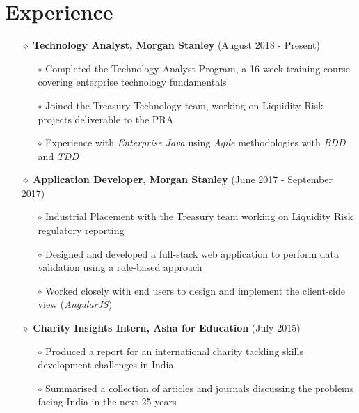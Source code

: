 \documentclass[a4paper]{article}
\begin{document}
\vspace{-10pt}
\section*{Experience}
\vspace{-7pt}

\begin{itemize} 
\item[$\diamond$] \textbf{Technology Analyst, Morgan Stanley} (August 2018 - Present)
\begin{itemize}
\item[$\circ$] Completed the Technology Analyst Program, a 16 week training course covering enterprise technology fundamentals
\item[$\circ$] Joined the Treasury Technology team, working on Liquidity Risk projects deliverable to the PRA
\item[$\circ$] Experience with \textit{Enterprise Java} using \textit{Agile} methodologies with \textit{BDD} and \textit{TDD}
\end{itemize}

\item[$\diamond$] \textbf{Application Developer, Morgan Stanley} (June 2017 - September 2017)
\begin{itemize}
\item[$\circ$] Industrial Placement with the Treasury team working on Liquidity Risk regulatory reporting
\item[$\circ$] Designed and developed a full-stack web application to perform data validation using a rule-based approach
\item[$\circ$] Worked closely with end users to design and implement the client-side view (\textit{AngularJS})
\end{itemize}

\item[$\diamond$] \textbf{Charity Insights Intern, Asha for Education} (July 2015)
\begin{itemize}
\item[$\circ$] Produced a report for an international charity tackling skills development challenges in India
\item[$\circ$] Summarised a collection of articles and journals discussing the problems facing India in the next 25 years
\end{itemize}

\end{itemize}

\vspace{-10pt}
\end{document}
